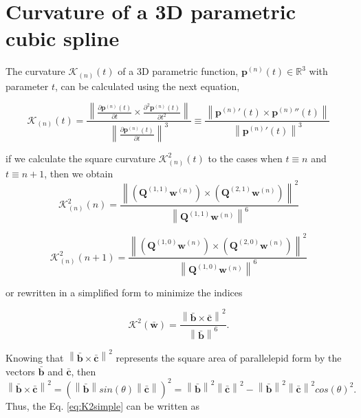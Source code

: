 \section{Curvature of a 3D parametric cubic spline}
\label{sec:curvaturemain}
The curvature $\mathcal{K}_{(n)}(t)$ of a 3D parametric function, 
$\mathbf{p}^{(n)}(t)\in \mathbb{R}^{3}$ with parameter $t$, 
can be calculated 
\cite[pp. 21]{toponogov2006differential} 
using the next equation,

\begin{equation}
\mathcal{K}_{(n)}(t)
=
\frac{\left\|\frac{\partial \mathbf{p}^{(n)}(t)}{\partial t} \times \frac{\partial^2 \mathbf{p}^{(n)}(t)}{\partial t^2} \right\|}
{\left\|\frac{\partial \mathbf{p}^{(n)}(t)}{\partial t}\right\|^{3}}
\equiv
\frac{\left\|{\mathbf{p}^{(n)}}'(t) \times {\mathbf{p}^{(n)}}''(t) \right\|}
{\left\|{\mathbf{p}^{(n)}}'(t)\right\|^{3}}
\end{equation}


if we calculate the square curvature $\mathcal{K}_{(n)}^{2}(t)$ to the cases when $t\equiv n$ and $t\equiv n+1$,
then we obtain
\begin{equation}
\mathcal{K}_{(n)}^{2}(n)
=
\frac{\left\|
\left( \mathbf{Q}^{(1,1)} \mathbf{w}^{(n)} \right)
\times 
\left( \mathbf{Q}^{(2,1)} \mathbf{w}^{(n)} \right)
\right\|^{2}}
{\left\| \mathbf{Q}^{(1,1)} \mathbf{w}^{(n)} \right\|^{6}}
\end{equation}

\begin{equation}
\mathcal{K}_{(n)}^{2}(n+1)
=
\frac{\left\|
\left( \mathbf{Q}^{(1,0)} \mathbf{w}^{(n)} \right)
\times 
\left( \mathbf{Q}^{(2,0)} \mathbf{w}^{(n)} \right)
\right\|^{2}}
{\left\| \mathbf{Q}^{(1,0)} \mathbf{w}^{(n)} \right\|^{6}}
\end{equation}


or rewritten in a simplified form to minimize the indices

\begin{equation}\label{eq:K2simple}
\mathcal{K}^{2}(\mathbf{\bar{w}})
=
\frac{
\left\|
\mathbf{\bar{b}} 
\times 
\mathbf{\bar{c}}
\right\|^{2}
}
{\left\| \mathbf{\bar{b}} \right\|^{6}}.
\end{equation}



Knowing that $\left\|
\mathbf{\bar{b}} 
\times 
\mathbf{\bar{c}}
\right\|^{2}$ 
represents the square area of parallelepid form by the vectors 
$\mathbf{\bar{b}}$ and $\mathbf{\bar{c}}$,
then
$\left\|
\mathbf{\bar{b}} 
\times 
\mathbf{\bar{c}}
\right\|^{2}
=
\left(
\left\|
\mathbf{\bar{b}}
\right\|
sin(\theta) 
\left\|
\mathbf{\bar{c}}
\right\|
\right)^{2}
=
\left\|
\mathbf{\bar{b}}
\right\|^{2}
\left\|
\mathbf{\bar{c}}
\right\|^{2}
-
\left\|
\mathbf{\bar{b}}
\right\|^{2}
\left\|
\mathbf{\bar{c}}
\right\|^{2}
cos(\theta)^{2}.
$ 
Thus, the Eq. \ref{eq:K2simple} can be written as 

